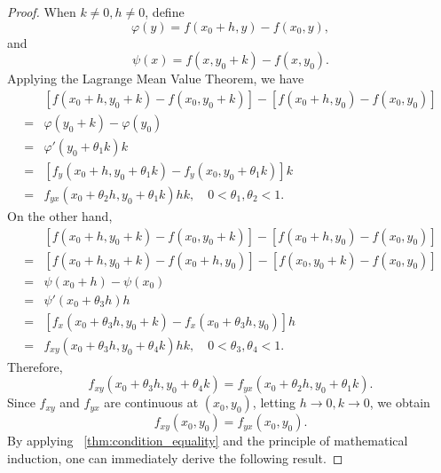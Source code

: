 \documentclass[11pt]{elegantbook}
\begin{document}
\begin{proof}
    When $k \neq 0, h \neq 0$, define
    \[
        \varphi(y) = f(x_0 + h, y) - f(x_0, y),
    \]
    and
    \[
        \psi(x) = f(x, y_0 + k) - f(x, y_0).
    \]
    Applying the Lagrange Mean Value Theorem, we have
    \[
        \begin{aligned}
            &[f(x_0 + h, y_0 + k) - f(x_0, y_0 + k)] - [f(x_0 + h, y_0) - f(x_0, y_0)] \\
            =& \varphi(y_0 + k) - \varphi(y_0) \\
            =& \varphi'(y_0 + \theta_1 k) k \\
            =& [f_y(x_0 + h, y_0 + \theta_1 k) - f_y(x_0, y_0 + \theta_1 k)] k \\
            =& f_{yx}(x_0 + \theta_2 h, y_0 + \theta_1 k) h k, \quad 0 < \theta_1, \theta_2 < 1.
        \end{aligned}
    \]
    On the other hand,
    \[
        \begin{aligned}
            &[f(x_0 + h, y_0 + k) - f(x_0, y_0 + k)] - [f(x_0 + h, y_0) - f(x_0, y_0)] \\
            =& [f(x_0 + h, y_0 + k) - f(x_0 + h, y_0)] - [f(x_0, y_0 + k) - f(x_0, y_0)] \\
            =& \psi(x_0 + h) - \psi(x_0) \\
            =& \psi'(x_0 + \theta_3 h) h \\
            =& [f_x(x_0 + \theta_{3}h, y_0 + k) - f_x(x_0 + \theta_{3}h, y_0)] h \\
            =& f_{xy}(x_0 + \theta_3 h, y_0 + \theta_4 k) h k, \quad 0 < \theta_3, \theta_4 < 1.
        \end{aligned}
    \]
    Therefore,
    \[
    f_{xy}(x_0 + \theta_3 h, y_0 + \theta_4 k) = f_{yx}(x_0 + \theta_2 h, y_0 + \theta_1 k).
    \]
    Since $f_{xy}$ and $f_{yx}$ are continuous at $(x_0, y_0)$, letting $h \to 0, k \to 0$, we obtain
    \[
    f_{xy}(x_0, y_0) = f_{yx}(x_0, y_0).
    \]
    By applying ~\ref{thm:condition_equality} and the principle of mathematical induction, one can immediately derive the following result.
\end{proof}
\end{document}
